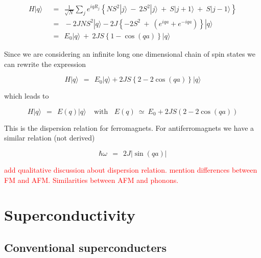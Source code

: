 \documentclass[10pt]{report}
\numberwithin{equation}{chapter}
\begin{document}
\begin{align}
  H | q \rangle ~~& =~~ \frac{1}{\sqrt{N}} \sum_j e^{i q R_j} \left\{
  NS^2 |j\rangle ~-~ 2S^2|j\rangle ~+~ S |j+1\rangle ~+~ S|j-1\rangle \right\} \nonumber \\
                  & =~~ -2JNS^2 |q\rangle - 2J \left\{ -2S^2 ~+~ \left( e^{iqa} + e^{-iqa} \right) \right\} |q\rangle \nonumber \\
                  & =~~ E_0 |q\rangle ~+~ 2JS \left\{ 1 - \cos(qa) \right\} |q\rangle 
\end{align}



Since we are considering an infinite long one dimensional chain of spin states we can rewrite the expression

\begin{equation}
  H |q\rangle ~~=~~ E_0 |q\rangle + 2JS \left\{ 2 - 2\cos(qa) \right\} |q\rangle
\end{equation} 

which leads to

\begin{equation}
  H |q\rangle ~~=~~ E(q) |q\rangle ~~~~~ \text{with} ~~~~ E(q) ~≃~ E_0 + 2JS(2 - 2\cos(qa))
\end{equation}

This is the dispersion relation for ferromagnets. For antiferromagnets we have a similar relation (not derived)

\begin{equation}
  \hbar \omega ~~=~~ 2J | \sin(qa) |
\end{equation}


\textcolor{red}{add qualitative discussion about dispersion relation. mention differences between FM and AFM. Similarities between AFM and phonons.}



\chapter{Superconductivity}

\section{Conventional superconducters}
\end{document}
